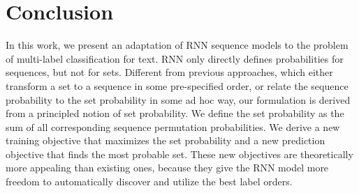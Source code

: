 \section{Conclusion}
In this work, we present an adaptation of RNN sequence models to the problem of multi-label classification for text. RNN only directly defines probabilities for sequences, but not for sets. Different from previous approaches, which either transform a set to a sequence in some pre-specified order, or relate the sequence probability to the set probability in some ad hoc way, our formulation is derived from a principled notion of set probability. We define the set probability as the sum of all corresponding sequence permutation probabilities. We derive a new training objective that maximizes the set probability and a new prediction objective that finds the most probable set. These new objectives are theoretically more appealing than existing ones, because they give the RNN model more freedom to automatically discover and utilize the best label orders.%

\label{sec:conclusion}